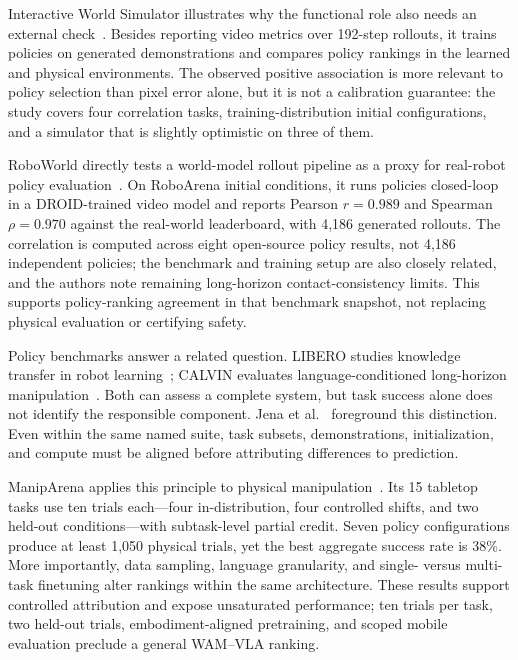 Interactive World Simulator illustrates why the functional role also needs an external check~\cite{wang2026interactive}. Besides reporting video metrics over 192-step rollouts, it trains policies on generated demonstrations and compares policy rankings in the learned and physical environments. The observed positive association is more relevant to policy selection than pixel error alone, but it is not a calibration guarantee: the study covers four correlation tasks, training-distribution initial configurations, and a simulator that is slightly optimistic on three of them.

RoboWorld directly tests a world-model rollout pipeline as a proxy for real-robot policy evaluation~\cite{jeon2026roboworld}. On RoboArena initial conditions, it runs policies closed-loop in a DROID-trained video model and reports Pearson $r=0.989$ and Spearman $\rho=0.970$ against the real-world leaderboard, with 4,186 generated rollouts. The correlation is computed across eight open-source policy results, not 4,186 independent policies; the benchmark and training setup are also closely related, and the authors note remaining long-horizon contact-consistency limits. This supports policy-ranking agreement in that benchmark snapshot, not replacing physical evaluation or certifying safety.

Policy benchmarks answer a related question. LIBERO studies knowledge transfer in robot learning~\cite{liu2023libero}; CALVIN evaluates language-conditioned long-horizon manipulation~\cite{mees2022calvin}. Both can assess a complete system, but task success alone does not identify the responsible component. Jena et al.~\cite{jena2026evaluation} foreground this distinction. Even within the same named suite, task subsets, demonstrations, initialization, and compute must be aligned before attributing differences to prediction.

ManipArena applies this principle to physical manipulation~\cite{sun2026maniparena}. Its 15 tabletop tasks use ten trials each---four in-distribution, four controlled shifts, and two held-out conditions---with subtask-level partial credit. Seven policy configurations produce at least 1,050 physical trials, yet the best aggregate success rate is 38\%. More importantly, data sampling, language granularity, and single- versus multi-task finetuning alter rankings within the same architecture. These results support controlled attribution and expose unsaturated performance; ten trials per task, two held-out trials, embodiment-aligned pretraining, and scoped mobile evaluation preclude a general WAM--VLA ranking.

